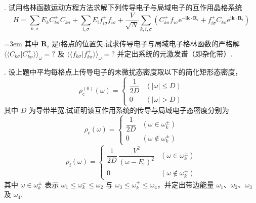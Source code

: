 {.} 试用格林函数运动方程方法求解下列传导电子与局域电子的互作用晶格系统
\begin{equation*}
  H=\sum_{k,\sigma}E_{k}C^{+}_{k\sigma}C_{k\sigma}
  +\sum_{i,\sigma}E_{\mathrm{f}}f^{+}_{i\sigma}f_{i\sigma}
  +\frac{V}{\sqrt{N}}\sum_{k,i,\sigma}
  \left(C^{+}_{k\sigma}f_{i\sigma}\mathrm{e}^{-\mathrm{i}\boldsymbol{k}\cdot\boldsymbol{R}_{i}}
  +f^{+}_{i\sigma}C_{k\sigma}\mathrm{e}^{\mathrm{i}\boldsymbol{k}\cdot\boldsymbol{R}_{i}}\right)
\end{equation*}
{\emergencystretch=3em
其中 $\boldsymbol{R}_{i}$ 是i格点的位置矢.试求传导电子与局域电子格林函数的严格解 $\langle\langle C_{k\sigma}|C^{+}_{k\sigma}\rangle\rangle_{\omega}=?$ 及 $\langle\langle f_{k\sigma}|f^{+}_{k\sigma}\rangle\rangle_{\omega}=?$ 并定出系统的元激发谱（即杂化带）.\par}

{.} 设上题中平均每格点上传导电子的未微扰态密度取以下的简化矩形态密度，
\begin{equation*}
  \rho_{\mathrm{c}}^{(0)}(\omega)=
  \begin{cases}
    \dfrac{1}{2D} & \left(|\omega|\leqslant D\right)\\[0.5em]
    0 & \left(|\omega|>D\right)
  \end{cases}
\end{equation*}
其中 $D$ 为导带半宽.试证明该互作用系统的传导与局域电子态密度分别为
\begin{equation*}
  \rho_{\mathrm{c}}(\omega)=
  \begin{cases}
    \dfrac{1}{2D} & \left(\omega\in\omega_{k}^{\pm}\right)\\[0.5em]
    0 & \left(\omega\notin\omega_{k}^{\pm}\right)
  \end{cases}
\end{equation*}
\begin{equation*}
  \rho_{\mathrm{f}}(\omega)=
  \begin{cases}
    \dfrac{1}{2D}\,\dfrac{V^{2}}{(\omega-E_{\mathrm{f}})^{2}} & \left(\omega\in\omega_{k}^{\pm}\right)\\[0.8em]
    0 & \left(\omega\notin\omega_{k}^{\pm}\right)
  \end{cases}
\end{equation*}
其中 $\omega\in\omega_{k}^{\pm}$ 表示 $\omega_{1}\leqslant\omega_{k}^{-}\leqslant\omega_{2}$ 与 $\omega_{3}\leqslant\omega_{k}^{+}\leqslant\omega_{4}$，并定出带边能量 $\omega_{1}$、$\omega_{2}$、$\omega_{3}$ 及 $\omega_{4}$.


